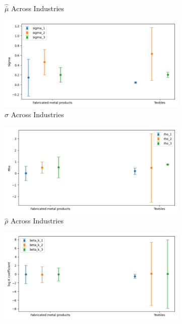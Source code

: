 \documentclass{article}
\begin{document}
\begin{figure}[ht!]
\begin{subfigure}[t]{0.32\textwidth}
        \caption{$\hat{\bar\mu}$ Across Industries}
    \end{subfigure}
    \begin{subfigure}[t]{0.32\textwidth}
        \centering
        \includegraphics[width=\textwidth]{figure/ar1_mixture_kmshare_ciiu_sigma_across_industries_m3.png}
        \caption{$\hat\sigma$ Across Industries}
    \end{subfigure}
    \begin{subfigure}[t]{0.32\textwidth}
        \centering
        \includegraphics[width=\textwidth]{figure/ar1_mixture_kmshare_ciiu_rho_across_industries_m3.png}
        \caption{$\hat\rho$ Across Industries}
    \end{subfigure}
    \begin{subfigure}[t]{0.32\textwidth}
        \centering
        \includegraphics[width=\textwidth]{figure/ar1_mixture_kmshare_ciiu_beta_k_across_industries_m3.png}

\end{subfigure}
\end{figure}
\end{document}
